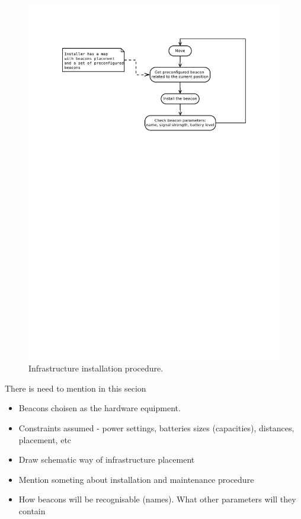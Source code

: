 \documentclass[../main.tex]{subfiles}
\begin{document}
\begin{figure}[!htbp]
\includegraphics[width=\textwidth, trim={0 18cm 0 0},clip]{pictures/infrastructure_installation_proc.pdf}
\centering
\caption{Infrastructure installation procedure.}
\label{fig:infrastructure_installation_proc}
\end{figure}

There is need to mention in this secion
\begin{itemize}
	\item Beacons choisen as the hardware equipment.
	\item Constraints assumed - power settings, batteries sizes (capacities), distances, placement, etc
	\item Draw schematic way of infrastructure placement
	\item Mention someting about installation and maintenance procedure
	\item How beacons will be recognisable (names). What other parameters will they contain
\end{itemize}
\end{document}

